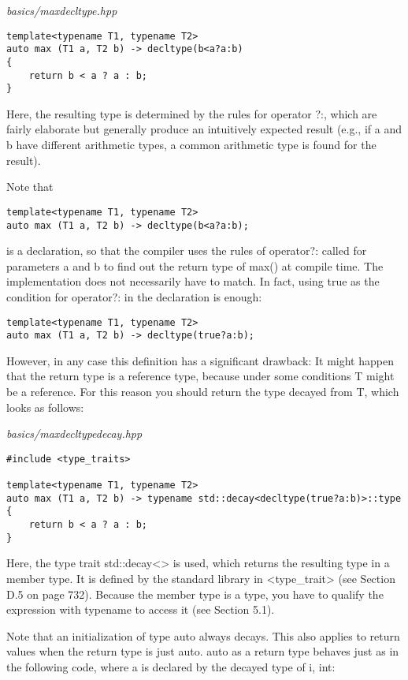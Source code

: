 \noindent
\textit{basics/maxdecltype.hpp}
\begin{lstlisting}[style=styleCXX]
template<typename T1, typename T2>
auto max (T1 a, T2 b) -> decltype(b<a?a:b)
{
	return b < a ? a : b;
}
\end{lstlisting}

Here, the resulting type is determined by the rules for operator ?:, which are fairly elaborate but generally produce an intuitively expected result (e.g., if a and b have different arithmetic types, a common arithmetic type is found for the result).

Note that

\begin{lstlisting}[style=styleCXX]
template<typename T1, typename T2>
auto max (T1 a, T2 b) -> decltype(b<a?a:b);
\end{lstlisting}

is a declaration, so that the compiler uses the rules of operator?: called for parameters a and b to find out the return type of max() at compile time. The implementation does not necessarily have to match. In fact, using true as the condition for operator?: in the declaration is enough:

\begin{lstlisting}[style=styleCXX]
template<typename T1, typename T2>
auto max (T1 a, T2 b) -> decltype(true?a:b);
\end{lstlisting}

However, in any case this definition has a significant drawback: It might happen that the return type is a reference type, because under some conditions T might be a reference. For this reason you should return the type decayed from T, which looks as follows:

\noindent
\textit{basics/maxdecltypedecay.hpp}
\begin{lstlisting}[style=styleCXX]
#include <type_traits>

template<typename T1, typename T2>
auto max (T1 a, T2 b) -> typename std::decay<decltype(true?a:b)>::type
{
	return b < a ? a : b;
}
\end{lstlisting}

Here, the type trait std::decay<> is used, which returns the resulting type in a member type. It is defined by the standard library in <type\_trait> (see Section D.5 on page 732). Because the member type is a type, you have to qualify the expression with typename to access it (see Section 5.1).

Note that an initialization of type auto always decays. This also applies to return values when the return type is just auto. auto as a return type behaves just as in the following code, where a is declared by the decayed type of i, int:

